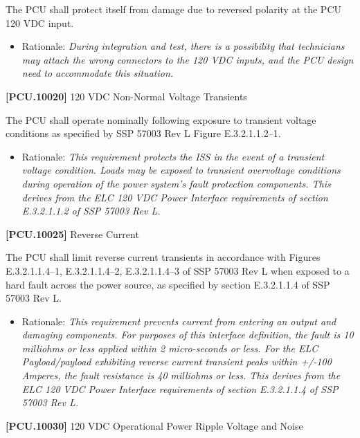 The \gls{PCU} shall protect itself from damage due to reversed polarity at the \gls{PCU} 120 \gls{VDC} input.

\begin{itemize}
\item{} Rationale: \emph{During integration and test, there is a possibility that technicians may attach the wrong connectors to the 120 VDC inputs, and the PCU design need to accommodate this situation.}

\end{itemize}

\textbf{[PCU.10020]} 120 \gls{VDC} Non-Normal Voltage Transients

The \gls{PCU} shall operate nominally following exposure to transient voltage conditions as specified by SSP 57003 Rev L Figure E.3.2.1.1.2--1.

\begin{itemize}
\item{} Rationale: \emph{This requirement protects the ISS in the event of a transient voltage condition. Loads may be exposed to transient overvoltage conditions during operation of the power system's fault protection components. This derives from the ELC 120 VDC Power Interface requirements of section E.3.2.1.1.2 of SSP 57003 Rev L.}

\end{itemize}

\textbf{[PCU.10025]} Reverse Current

The \gls{PCU} shall limit reverse current transients in accordance with Figures E.3.2.1.1.4--1, E.3.2.1.1.4--2, E.3.2.1.1.4--3 of SSP 57003 Rev L when exposed to a hard fault across the power source, as specified by section E.3.2.1.1.4 of SSP 57003 Rev L.

\begin{itemize}
\item{} Rationale: \emph{This requirement prevents current from entering an output and damaging components. For purposes of this interface definition, the fault is 10 milliohms or less applied within 2 micro-seconds or less. For the ELC Payload\slash payload exhibiting reverse current transient peaks within +\slash -100 Amperes, the fault resistance is 40 milliohms or less. This derives from the ELC 120 VDC Power Interface requirements of section E.3.2.1.1.4 of SSP 57003 Rev L.}

\end{itemize}

\textbf{[PCU.10030]} 120 \gls{VDC} Operational Power Ripple Voltage and Noise

